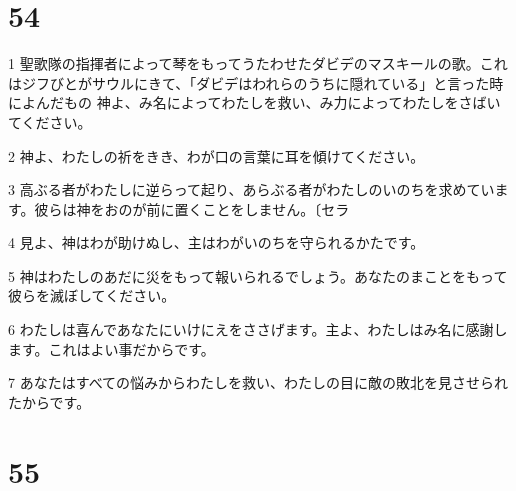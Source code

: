 \chapter{54}

\par 1 聖歌隊の指揮者によって琴をもってうたわせたダビデのマスキールの歌。これはジフびとがサウルにきて、「ダビデはわれらのうちに隠れている」と言った時によんだもの 神よ、み名によってわたしを救い、み力によってわたしをさばいてください。
\par 2 神よ、わたしの祈をきき、わが口の言葉に耳を傾けてください。
\par 3 高ぶる者がわたしに逆らって起り、あらぶる者がわたしのいのちを求めています。彼らは神をおのが前に置くことをしません。〔セラ
\par 4 見よ、神はわが助けぬし、主はわがいのちを守られるかたです。
\par 5 神はわたしのあだに災をもって報いられるでしょう。あなたのまことをもって彼らを滅ぼしてください。
\par 6 わたしは喜んであなたにいけにえをささげます。主よ、わたしはみ名に感謝します。これはよい事だからです。
\par 7 あなたはすべての悩みからわたしを救い、わたしの目に敵の敗北を見させられたからです。

\chapter{55}

